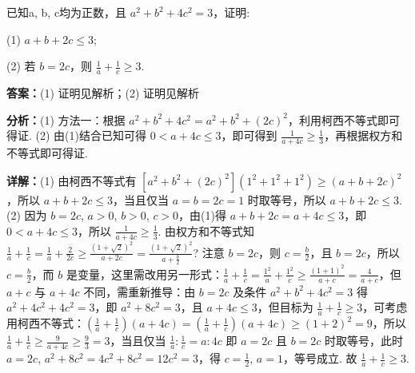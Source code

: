 \begin{question}[points=10]
已知a, b, c均为正数，且 $a^2+b^2+4c^2=3$，证明:

(1) $a+b+2c\leq 3$;

(2) 若 $b=2c$，则 $\frac{1}{a}+\frac{1}{c}\geq 3$.
\begin{solution}
\textbf{答案：}(1) 证明见解析；(2) 证明见解析

\textbf{分析：}(1) 方法一：根据 $a^2+b^2+4c^2=a^2+b^2+(2c)^2$，利用柯西不等式即可得证. (2) 由(1)结合已知可得 $0<a+4c\leq 3$，即可得到 $\frac{1}{a+4c}\geq \frac{1}{3}$，再根据权方和不等式即可得证.

\textbf{详解：}(1) 由柯西不等式有 $[a^2+b^2+(2c)^2](1^2+1^2+1^2)\geq (a+b+2c)^2$，所以 $a+b+2c\leq 3$，当且仅当 $a=b=2c=1$ 时取等号，所以 $a+b+2c\leq 3$.
(2) 因为 $b=2c$, $a>0$, $b>0$, $c>0$，由(1)得 $a+b+2c=a+4c\leq 3$，即 $0<a+4c\leq 3$，所以 $\frac{1}{a+4c}\geq \frac{1}{3}$. 由权方和不等式知 $\frac{1}{a}+\frac{1}{c}=\frac{1}{a}+\frac{2}{2c}\geq \frac{(1+\sqrt{2})^2}{a+2c}=\frac{(1+\sqrt{2})^2}{a+\frac{b}{2}}$? 注意 $b=2c$，则 $c=\frac{b}{2}$，且 $b=2c$，所以 $c=\frac{b}{2}$，而 $b$ 是变量，这里需改用另一形式：$\frac{1}{a}+\frac{1}{c}=\frac{1^2}{a}+\frac{1^2}{c}\geq \frac{(1+1)^2}{a+c}=\frac{4}{a+c}$，但 $a+c$ 与 $a+4c$ 不同，需重新推导：由 $b=2c$ 及条件 $a^2+b^2+4c^2=3$ 得 $a^2+4c^2+4c^2=3$，即 $a^2+8c^2=3$，且 $a+4c\leq 3$，但目标为 $\frac{1}{a}+\frac{1}{c}\geq 3$，可考虑用柯西不等式：$(\frac{1}{a}+\frac{1}{c})(a+4c)=(\frac{1}{a}+\frac{1}{c})(a+4c)\geq (1+2)^2=9$，所以 $\frac{1}{a}+\frac{1}{c}\geq \frac{9}{a+4c}\geq \frac{9}{3}=3$，当且仅当 $\frac{1}{a}:\frac{1}{c}=a:4c$ 即 $a=2c$ 且 $b=2c$ 时取等号，此时 $a=2c$, $a^2+8c^2=4c^2+8c^2=12c^2=3$，得 $c=\frac{1}{2}$, $a=1$，等号成立. 故 $\frac{1}{a}+\frac{1}{c}\geq 3$.
\end{solution}
\end{question}

